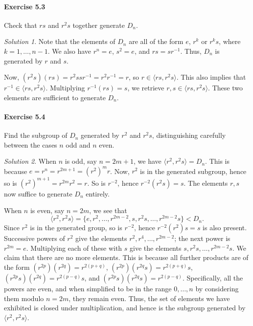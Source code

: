 \documentclass[11pt]{report}
\theoremstyle{remark}
\newtheorem*{solution}{Solution}
\begin{document}
    
    \paragraph{Exercise 5.3} Check that $rs$ and $r^2s$ together generate $D_n$.
    \begin{solution}
        Note that the elements of $D_n$ are all of the form $e$, $r^k$ or $r^ks$,
        where $k = 1, \dots, n - 1$. We also have $r^n = e$, $s^2 = e$, and $rs =
        sr^{-1}$. Thus, $D_n$ is generated by $r$ and $s$.

        Now, $(r^2s)(rs) = r^2ssr^{-1} = r^2r^{-1} = r$, so $r \in \langle rs,
        r^2s\rangle$. This also implies that $r^{-1} \in \langle rs, r^2s\rangle$.
        Multiplying $r^{-1}(rs) = s$, we retrieve $r, s \in \langle rs,
        r^2s\rangle$. These two elements are sufficient to generate $D_n$.
    \end{solution}

    \paragraph{Exercise 5.4} Find the subgroup of $D_n$ generated by $r^2$ and
    $r^2s$, distinguishing carefully between the cases $n$ odd and $n$ even.
    \begin{solution}
        When $n$ is odd, say $n = 2m + 1$, we have $\langle r^2, r^2s\rangle = D_n$.
        This is because $e = r^{n} = r^{2m + 1} = (r^2)^m r$. Now, $r^2$ is in the
        generated subgroup, hence so is $(r^2)^{m + 1} = r^{2m}r^2 = r$. So is
        $r^{-2}$, hence $r^{-2}(r^2s) = s$. The elements $r, s$ now suffice to
        generate $D_n$ entirely.

        When $n$ is even, say $n = 2m$, we see that \[
            \langle r^2, r^2s\rangle = \{e, r^2, \dots, r^{2m - 2}, s, r^2s, \dots,
            r^{2m - 2}s\} < D_n.
        \] Since $r^2$ is in the generated group, so is $r^{-2}$, hence
        $r^{-2}(r^2)s = s$ is also present. Successive powers of $r^2$ give the
        elements $r^2, r^4, \dots, r^{2m - 2}$; the next power is $r^{2m} = e$.
        Multiplying each of these with $s$ give the elements $s, r^2s, \dots, r^{2m
        - 2}s$. We claim that there are no more elements. This is because all
        further products are of the form $(r^{2p})(r^{2q}) = r^{2(p + q)}$,
        $(r^{2p})(r^{2q}s) = r^{2(p + q)}s$, $(r^{2p}s)(r^{2q}) = r^{2(p - q)}s$,
        and $(r^{2p}s)(r^{2q}s) = r^{2(p - q)}$. Specifically, all the powers are
        even, and when simplified to be in the range $0, \dots, n$ by considering
        them modulo $n = 2m$, they remain even. Thus, the set of elements we have
        exhibited is closed under multiplication, and hence is the subgroup
        generated by $\langle r^2, r^2s\rangle$.
    \end{solution}
\end{document}
